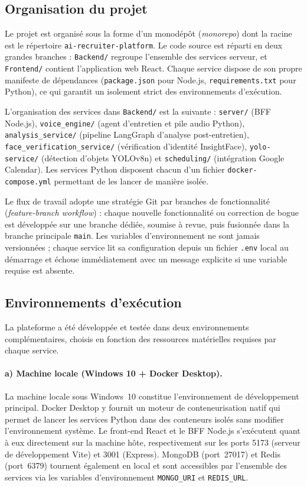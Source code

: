 \subsection{Organisation du projet}

Le projet est organisé sous la forme d'un monodépôt (\textit{monorepo}) dont la racine
est le répertoire \texttt{ai-recruiter-platform}. Le code source est réparti en deux
grandes branches : \texttt{Backend/} regroupe l'ensemble des services serveur, et
\texttt{Frontend/} contient l'application web React. Chaque service dispose de son propre
manifeste de dépendances (\texttt{package.json} pour Node.js, \texttt{requirements.txt}
pour Python), ce qui garantit un isolement strict des environnements d'exécution.

\begin{sloppypar}
L'organisation des services dans \texttt{Backend/} est la suivante :
\texttt{server/} (BFF Node.js), \texttt{voice\_engine/} (agent d'entretien et pile audio
Python), \texttt{analysis\_service/} (pipeline LangGraph d'analyse post-entretien),
\texttt{face\_verification\_service/} (vérification d'identité InsightFace),
\texttt{yolo-service/} (détection d'objets YOLOv8n) et \texttt{scheduling/}
(intégration Google Calendar). Les services Python disposent chacun d'un fichier
\texttt{docker-compose.yml} permettant de les lancer de manière isolée.
\end{sloppypar}

Le flux de travail adopte une stratégie Git par branches de fonctionnalité
(\textit{feature-branch workflow}) : chaque nouvelle fonctionnalité ou correction de bogue
est développée sur une branche dédiée, soumise à revue, puis fusionnée dans la branche
principale \texttt{main}. Les variables d'environnement ne sont jamais versionnées ; chaque
service lit sa configuration depuis un fichier \texttt{.env} local au démarrage et échoue
immédiatement avec un message explicite si une variable requise est absente.

\subsection{Environnements d'exécution}

La plateforme a été développée et testée dans deux environnements complémentaires, choisis
en fonction des ressources matérielles requises par chaque service.

\paragraph{a) Machine locale (Windows 10 + Docker Desktop).}
La machine locale sous Windows~10 constitue l'environnement de développement principal.
Docker Desktop y fournit un moteur de conteneurisation natif qui permet de lancer les
services Python dans des conteneurs isolés sans modifier l'environnement système. Le
front-end React et le BFF Node.js s'exécutent quant à eux directement sur la machine hôte,
respectivement sur les ports 5173 (serveur de développement Vite) et 3001 (Express).
MongoDB (port~27017) et Redis (port~6379) tournent également en local et sont accessibles
par l'ensemble des services via les variables d'environnement \texttt{MONGO\_URI} et
\texttt{REDIS\_URL}.

